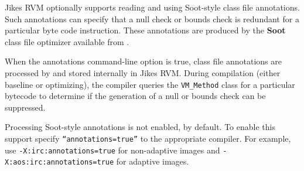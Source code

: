 Jikes RVM optionally supports reading and using Soot-style class file
annotations.  Such annotations can specify that a null check or bounds
check is redundant for a particular byte code instruction.  These
annotations are produced by the {\bf Soot} class file optimizer
available from
\xlink{\SOOTURL}{\SOOTURL}.  

When the annotations command-line option is true, class file
annotations are processed by  and stored internally in Jikes RVM.
During compilation (either baseline or optimizing), the compiler 
queries the {\tt VM\_Method} class for a particular bytecode to
determine if the generation of a null or bounds check can be
suppressed. 

Processing Soot-style annotations is not enabled, by default.  To
enable this support specify {\tt ``annotations=true''} to the
appropriate compiler.  For example, use {\tt -X:irc:annotations=true}
for non-adaptive images and {\tt -X:aos:irc:annotations=true} for
adaptive images.


